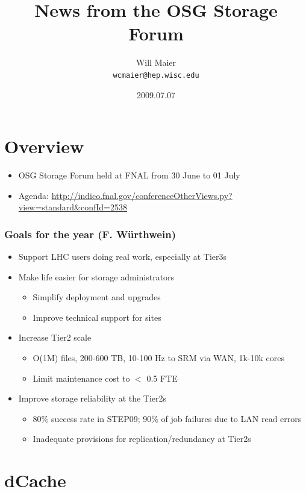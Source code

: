 \documentclass{beamer}
\title{News from the OSG Storage Forum}
\author[Maier]{
    Will Maier \\ 
    {\tt wcmaier@hep.wisc.edu}}
\institute[Wisconsin]{University of Wisconsin - High Energy Physics}
\date{2009.07.07}
\begin{document}
\begin{frame}
    \titlepage
\end{frame}

\section{Overview}
\begin{frame}
    \tableofcontents
\begin{itemize}
	\item OSG Storage Forum held at FNAL from 30 June to 01 July
	\item Agenda: \url{http://indico.fnal.gov/conferenceOtherViews.py?view=standard&confId=2538}
\end{itemize}
\end{frame}

\begin{frame}
\frametitle{Goals for the year (F. W\"urthwein)}
\begin{itemize}
	\item Support LHC users doing real work, especially at Tier3s
	\item Make life easier for storage administrators
	\begin{itemize}
		\item Simplify deployment and upgrades
		\item Improve technical support for sites
	\end{itemize}
	\item Increase Tier2 scale
	\begin{itemize}
		\item O(1M) files, 200-600 TB, 10-100 Hz to SRM via WAN, 1k-10k cores
		\item Limit maintenance cost to $<$ 0.5 FTE
	\end{itemize}
	\item Improve storage reliability at the Tier2s
	\begin{itemize}
		\item 80\% success rate in STEP09; 90\% of job failures due to LAN read errors
		\item Inadequate provisions for replication/redundancy at Tier2s
	\end{itemize}
\end{itemize}
\end{frame}

\section{dCache}
\end{document}
